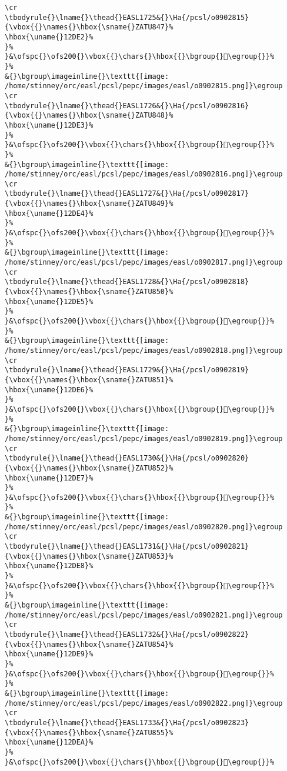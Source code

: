 \begin{verbatim}
\cr
\tbodyrule{}\lname{}\thead{}EASL1725&{}\Ha{/pcsl/o0902815}{\vbox{{}\names{}\hbox{\sname{}ZATU847}%
\hbox{\uname{}12DE2}%
}%
}&\ofspc{}\ofs200{}\vbox{{}\chars{}\hbox{{}\bgroup{}𒷢\egroup{}}%
}%
&{}\bgroup\imageinline{}\texttt{[image: /home/stinney/orc/easl/pcsl/pepc/images/easl/o0902815.png]}\egroup
\cr
\tbodyrule{}\lname{}\thead{}EASL1726&{}\Ha{/pcsl/o0902816}{\vbox{{}\names{}\hbox{\sname{}ZATU848}%
\hbox{\uname{}12DE3}%
}%
}&\ofspc{}\ofs200{}\vbox{{}\chars{}\hbox{{}\bgroup{}𒷣\egroup{}}%
}%
&{}\bgroup\imageinline{}\texttt{[image: /home/stinney/orc/easl/pcsl/pepc/images/easl/o0902816.png]}\egroup
\cr
\tbodyrule{}\lname{}\thead{}EASL1727&{}\Ha{/pcsl/o0902817}{\vbox{{}\names{}\hbox{\sname{}ZATU849}%
\hbox{\uname{}12DE4}%
}%
}&\ofspc{}\ofs200{}\vbox{{}\chars{}\hbox{{}\bgroup{}𒷤\egroup{}}%
}%
&{}\bgroup\imageinline{}\texttt{[image: /home/stinney/orc/easl/pcsl/pepc/images/easl/o0902817.png]}\egroup
\cr
\tbodyrule{}\lname{}\thead{}EASL1728&{}\Ha{/pcsl/o0902818}{\vbox{{}\names{}\hbox{\sname{}ZATU850}%
\hbox{\uname{}12DE5}%
}%
}&\ofspc{}\ofs200{}\vbox{{}\chars{}\hbox{{}\bgroup{}𒷥\egroup{}}%
}%
&{}\bgroup\imageinline{}\texttt{[image: /home/stinney/orc/easl/pcsl/pepc/images/easl/o0902818.png]}\egroup
\cr
\tbodyrule{}\lname{}\thead{}EASL1729&{}\Ha{/pcsl/o0902819}{\vbox{{}\names{}\hbox{\sname{}ZATU851}%
\hbox{\uname{}12DE6}%
}%
}&\ofspc{}\ofs200{}\vbox{{}\chars{}\hbox{{}\bgroup{}𒷦\egroup{}}%
}%
&{}\bgroup\imageinline{}\texttt{[image: /home/stinney/orc/easl/pcsl/pepc/images/easl/o0902819.png]}\egroup
\cr
\tbodyrule{}\lname{}\thead{}EASL1730&{}\Ha{/pcsl/o0902820}{\vbox{{}\names{}\hbox{\sname{}ZATU852}%
\hbox{\uname{}12DE7}%
}%
}&\ofspc{}\ofs200{}\vbox{{}\chars{}\hbox{{}\bgroup{}𒷧\egroup{}}%
}%
&{}\bgroup\imageinline{}\texttt{[image: /home/stinney/orc/easl/pcsl/pepc/images/easl/o0902820.png]}\egroup
\cr
\tbodyrule{}\lname{}\thead{}EASL1731&{}\Ha{/pcsl/o0902821}{\vbox{{}\names{}\hbox{\sname{}ZATU853}%
\hbox{\uname{}12DE8}%
}%
}&\ofspc{}\ofs200{}\vbox{{}\chars{}\hbox{{}\bgroup{}𒷨\egroup{}}%
}%
&{}\bgroup\imageinline{}\texttt{[image: /home/stinney/orc/easl/pcsl/pepc/images/easl/o0902821.png]}\egroup
\cr
\tbodyrule{}\lname{}\thead{}EASL1732&{}\Ha{/pcsl/o0902822}{\vbox{{}\names{}\hbox{\sname{}ZATU854}%
\hbox{\uname{}12DE9}%
}%
}&\ofspc{}\ofs200{}\vbox{{}\chars{}\hbox{{}\bgroup{}𒷩\egroup{}}%
}%
&{}\bgroup\imageinline{}\texttt{[image: /home/stinney/orc/easl/pcsl/pepc/images/easl/o0902822.png]}\egroup
\cr
\tbodyrule{}\lname{}\thead{}EASL1733&{}\Ha{/pcsl/o0902823}{\vbox{{}\names{}\hbox{\sname{}ZATU855}%
\hbox{\uname{}12DEA}%
}%
}&\ofspc{}\ofs200{}\vbox{{}\chars{}\hbox{{}\bgroup{}𒷪\egroup{}}%

\end{verbatim}

